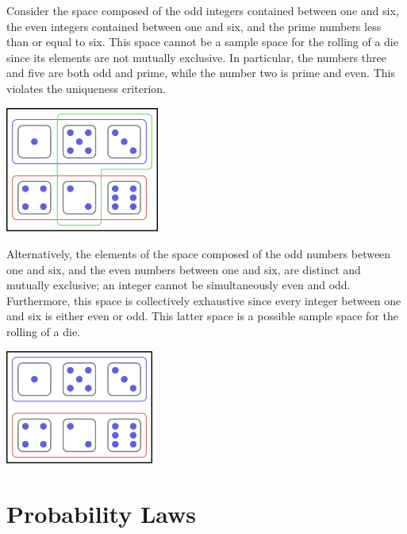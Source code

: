 \begin{example}
Consider the space composed of the odd integers contained between one and six, the even integers contained between one and six, and the prime numbers less than or equal to six.
This space cannot be a sample space for the rolling of a die since its elements are not mutually exclusive.
In particular, the numbers three and five are both odd and prime, while the number two is prime and even.
This violates the uniqueness criterion.

\begin{center}
\includegraphics[height=4.125cm]{Figures/2Chapter/nonadmissiblespace}
\end{center}

Alternatively, the elements of the space composed of the odd numbers between one and six, and the even numbers between one and six, are distinct and mutually exclusive;
an integer cannot be simultaneously even and odd.
Furthermore, this space is collectively exhaustive since every integer between one and six is either even or odd.
This latter space is a possible sample space for the rolling of a die.

\begin{center}
\includegraphics[height=3.75cm]{Figures/2Chapter/admissiblespace}
\end{center}
\end{example}


\section{Probability Laws}
\label{section:ProbabilityLaws}

